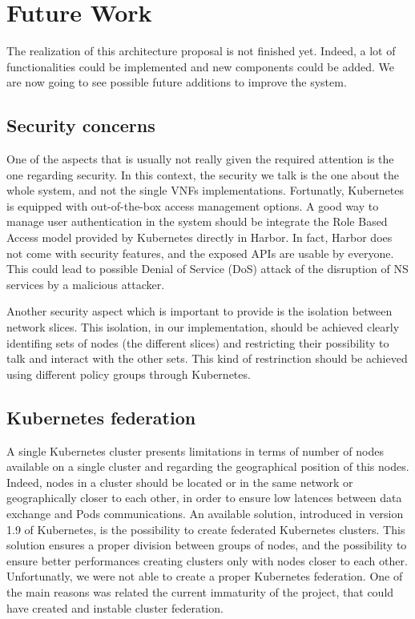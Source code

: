 \chapter{Future Work}
\label{chap:fw}

The realization of this architecture proposal is not finished yet. Indeed, a lot
of functionalities could be implemented and new components could be added. We
are now going to see possible future additions to improve the system.

\section{Security concerns}

One of the aspects that is usually not really given the required attention is
the one regarding security. In this context, the security we talk is the one
about the whole system, and not the single VNFs implementations. Fortunatly,
Kubernetes is equipped with out-of-the-box access management options. A good way
to manage user authentication in the system should be integrate the Role Based
Access model provided by Kubernetes directly in Harbor. In fact, Harbor does not
come with security features, and the exposed APIs are usable by everyone. This
could lead to possible Denial of Service (DoS) attack of the disruption of NS
services by a malicious attacker.

Another security aspect which is important to provide is the isolation between
network slices. This isolation, in our implementation, should be achieved
clearly identifing sets of nodes (the different slices) and restricting their
possibility to talk and interact with the other sets. This kind of restrinction
should be achieved using different policy groups through Kubernetes.

\section{Kubernetes federation}

A single Kubernetes cluster presents limitations in terms of number of nodes
available on a single cluster and regarding the geographical position of this
nodes. Indeed, nodes in a cluster should be located or in the same network or
geographically closer to each other, in order to ensure low latences between
data exchange and Pods communications. An available solution, introduced in
version 1.9 of Kubernetes, is the possibility to create federated Kubernetes
clusters. This solution ensures a proper division between groups of nodes, and
the possibility to ensure better performances creating clusters only with nodes
closer to each other. Unfortunatly, we were not able to create a proper
Kubernetes federation. One of the main reasons was related the current
immaturity of the project, that could have created and instable cluster
federation.

